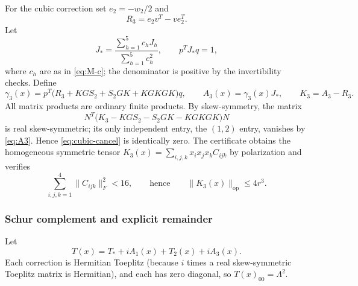 \documentclass[11pt]{article}
\newcommand{\Op}{\mathrm{op}}
\begin{document}
For the cubic correction set $e_2=-w_2/2$ and
\begin{equation}\label{eq:R3}
 R_3=e_2v^T-ve_2^T.
\end{equation}
Let
\begin{equation}\label{eq:Jstar}
 J_*=\frac{\sum_{h=1}^5c_hJ_h}{\sum_{h=1}^5c_h^2},
 \qquad p^TJ_*q=1,
\end{equation}
where $c_h$ are as in \eqref{eq:M-c}; the denominator is positive by the invertibility checks. Define
\begin{equation}\label{eq:A3}
 \gamma_3(x)=p^T\bigl(R_3+KGS_2+S_2GK+KGKGK\bigr)q,
 \qquad A_3(x)=\gamma_3(x)J_*,\qquad K_3=A_3-R_3.
\end{equation}
All matrix products are ordinary finite products. By skew-symmetry, the matrix
\begin{equation}\label{eq:cubic-cancel}
 N^T\bigl(K_3-KGS_2-S_2GK-KGKGK\bigr)N
\end{equation}
is real skew-symmetric; its only independent entry, the $(1,2)$ entry, vanishes by \eqref{eq:A3}. Hence \eqref{eq:cubic-cancel} is identically zero. The certificate obtains the homogeneous symmetric tensor $K_3(x)=\sum_{i,j,k}x_ix_jx_kC_{ijk}$ by polarization and verifies
\begin{equation}\label{eq:K3-bound}
 \sum_{i,j,k=1}^4\|C_{ijk}\|_F^2<16,
 \qquad\text{hence}\qquad\|K_3(x)\|_\Op\le4r^3.
\end{equation}

\subsubsection{Schur complement and explicit remainder}

Let
\begin{equation}\label{eq:Ttheta}
 T(x)=T_*+iA_1(x)+T_2(x)+iA_3(x).
\end{equation}
Each correction is Hermitian Toeplitz (because $i$ times a real skew-symmetric Toeplitz matrix is Hermitian), and each has zero diagonal, so $T(x)_{00}=\Lambda^2$.
\end{document}
